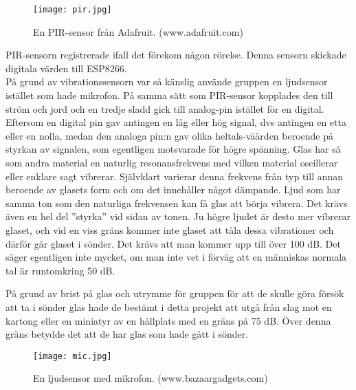 \begin{figure}[h]

  \texttt{[image: pir.jpg]}
  \caption{En PIR-sensor från Adafruit. (www.adafruit.com)}
  \label{fig:pir}
\end{figure}
PIR-sensorn registrerade ifall det förekom någon rörelse. Denna sensorn skickade digitala värden till ESP8266.\\

På grund av vibrationssensorn var så känslig använde gruppen en ljudsensor istället som hade mikrofon. På samma sätt som PIR-sensor kopplades den till ström och jord och en tredje sladd gick till analog-pin istället för en digital. Eftersom en digital pin gav antingen en låg eller hög signal, dvs antingen en etta eller en nolla, medan den analoga pin:n gav olika heltals-väärden beroende på styrkan av signalen, som egentligen motsvarade för högre spänning. 
Glas har så som andra material en naturlig resonansfrekvens med vilken material oscillerar eller enklare sagt vibrerar. Självklart varierar denna frekvens från typ till annan beroende av glasets form och om det innehåller något dämpande. Ljud som har samma ton som den naturliga frekvensen kan få glas att börja vibrera. Det krävs även en hel del ”styrka” vid sidan av tonen. Ju högre ljudet är desto mer vibrerar glaset, och vid en viss gräns kommer inte glaset att tåla dessa vibrationer och därför går glaset i sönder. Det krävs att man kommer upp till över 100 dB. Det säger egentligen inte mycket, om man inte vet i förväg att en människas normala tal är runtomkring 50 dB. 

På grund av brist på glas och utrymme för gruppen för att de skulle  göra försök att ta i sönder glas hade de bestämt i detta projekt att utgå från slag mot en kartong eller en miniatyr av en hållplats med en gräns på 75 dB. Över denna gräns betydde det att de har glas som hade gått i sönder.\\
\begin{figure}[h]

  \texttt{[image: mic.jpg]}
  \caption{En ljudsensor med mikrofon. (www.bazaargadgets.com)}
  \label{fig:mic}
\end{figure}

